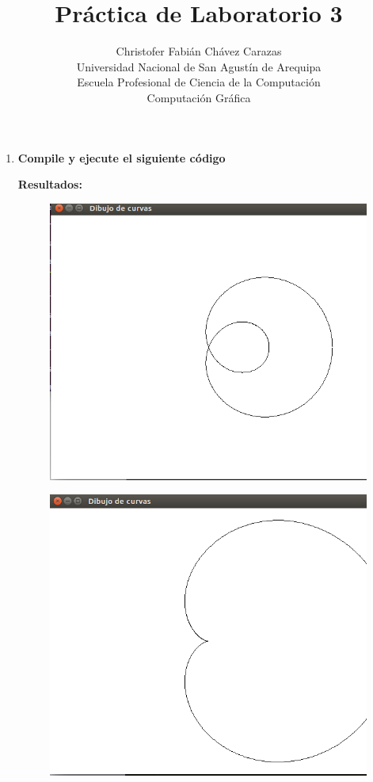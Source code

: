 \documentclass[a4paper,12pt]{article}
\begin{document}
\title{Práctica de Laboratorio 3}
\author{
Christofer Fabián Chávez Carazas \\
\small{Universidad Nacional de San Agustín de Arequipa} \\
\small{Escuela Profesional de Ciencia de la Computación} \\
\small{Computación Gráfica}
}
\date{}

\maketitle

\begin{enumerate}
 \item \textbf{Compile y ejecute el siguiente código}
 
 \textbf{Resultados:}
 \begin{figure}[H]
  \centering
  \includegraphics[scale = 0.3]{1.png}
 \end{figure}
 \begin{figure}[H]
  \centering
  \includegraphics[scale = 0.3]{2.png}

\end{figure}
\end{enumerate}
\end{document}
